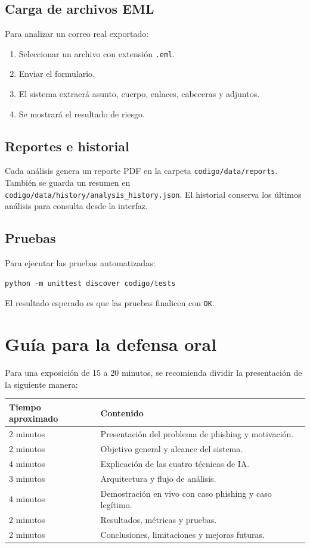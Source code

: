 \documentclass[12pt,letterpaper]{article}
\begin{document}
\subsection{Carga de archivos EML}

Para analizar un correo real exportado:

\begin{enumerate}
    \item Seleccionar un archivo con extensión \texttt{.eml}.
    \item Enviar el formulario.
    \item El sistema extraerá asunto, cuerpo, enlaces, cabeceras y adjuntos.
    \item Se mostrará el resultado de riesgo.
\end{enumerate}

\subsection{Reportes e historial}

Cada análisis genera un reporte PDF en la carpeta \texttt{codigo/data/reports}. También se guarda un resumen en \texttt{codigo/data/history/analysis\_history.json}. El historial conserva los últimos análisis para consulta desde la interfaz.

\subsection{Pruebas}

Para ejecutar las pruebas automatizadas:

\begin{verbatim}
python -m unittest discover codigo/tests
\end{verbatim}

El resultado esperado es que las pruebas finalicen con \texttt{OK}.

\section{Guía para la defensa oral}

Para una exposición de 15 a 20 minutos, se recomienda dividir la presentación de la siguiente manera:

\begin{longtable}{p{4cm}p{10cm}}
\toprule
\textbf{Tiempo aproximado} & \textbf{Contenido} \\
\midrule
2 minutos & Presentación del problema de phishing y motivación. \\
2 minutos & Objetivo general y alcance del sistema. \\
4 minutos & Explicación de las cuatro técnicas de IA. \\
3 minutos & Arquitectura y flujo de análisis. \\
4 minutos & Demostración en vivo con caso phishing y caso legítimo. \\
2 minutos & Resultados, métricas y pruebas. \\
2 minutos & Conclusiones, limitaciones y mejoras futuras. \\
\bottomrule
\end{longtable}
\end{document}
